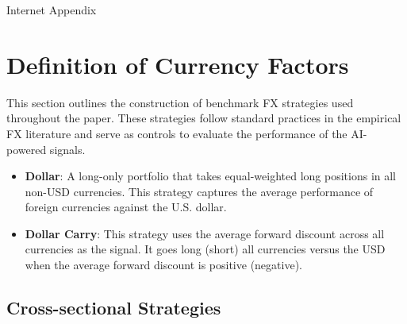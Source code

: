 \documentclass[12pt,oneside,letter]{article}
\begin{document}
{}
\begin{appendices}  \label{appendix}
	\begin{center}
		
		{\Large Internet Appendix}
		
	\end{center}
	
	
	\setcounter{section}{0}
	\setcounter{subsection}{0}
	\renewcommand{\thesection}{\Alph{section}}
	\renewcommand{\thesubsection}{\thesection.\arabic{subsection}}
	
	\setcounter{equation}{0}
	\renewcommand{\theequation}{\thesection.\arabic{equation}}
	
	\setcounter{table}{0}
	\renewcommand\thetable{A.\arabic{table}}
	
	\setcounter{figure}{0}
	\renewcommand\thefigure{A.\arabic{figure}}
	
	\renewcommand{\thepage}{A-\arabic{page}}
	\setcounter{page}{1}
	
	\section{Definition of Currency Factors} \label{Appendix:Definition of FX factors}
		This section outlines the construction of benchmark FX strategies used throughout the paper. These strategies follow standard practices in the empirical FX literature \citep{CHERNOV/ETAL:2023} and serve as controls to evaluate the performance of the AI-powered signals.
		\begin{itemize}
			\item \textbf{Dollar}: A long-only portfolio that takes equal-weighted long positions in all non-USD currencies. This strategy captures the average performance of foreign currencies against the U.S. dollar.
			\item \textbf{Dollar Carry}: This strategy uses the average forward discount across all currencies as the signal. It goes long (short) all currencies versus the USD when the average forward discount is positive (negative).
		\end{itemize}
		\subsection*{Cross-sectional Strategies}
		

\end{appendices}
\end{document}
